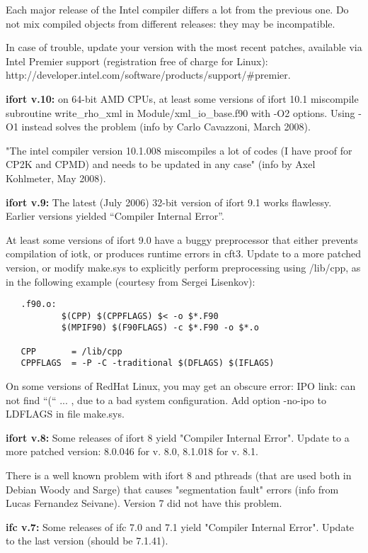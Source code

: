 \documentclass[12pt,a4paper]{article}
\begin{document}
Each major release of the Intel compiler differs a lot from the previous one.
Do not mix compiled objects from different releases: they may be incompatible.
    
In case of trouble, update your version with the most recent patches,
available via Intel Premier support (registration free of charge for Linux):
http://developer.intel.com/software/products/support/\#premier.

{\bf ifort v.10:} on 64-bit AMD CPUs, at least some versions of ifort 10.1 
miscompile subroutine write\_rho\_xml in Module/xml\_io\_base.f90 with -O2
options. Using -O1 instead solves the problem (info by Carlo
Cavazzoni, March 2008). 

"The intel compiler version 10.1.008 miscompiles a lot of codes (I have proof 
for CP2K and CPMD) and needs to be updated in any case" (info by Axel
Kohlmeter, May 2008).
 
{\bf ifort v.9:} The latest (July 2006) 32-bit version of ifort 9.1
works flawlessy. Earlier versions yielded ``Compiler Internal Error''.

At least some versions of ifort 9.0 have a buggy preprocessor that either
prevents compilation of iotk, or produces runtime errors in cft3. Update
to a more patched version, or modify make.sys to explicitly perform 
preprocessing using /lib/cpp, as in the following example (courtesy from Sergei
Lisenkov):
\begin{verbatim}
   .f90.o:
           $(CPP) $(CPPFLAGS) $< -o $*.F90
           $(MPIF90) $(F90FLAGS) -c $*.F90 -o $*.o

   CPP       = /lib/cpp
   CPPFLAGS  = -P -C -traditional $(DFLAGS) $(IFLAGS)
\end{verbatim}
    
On some versions of RedHat Linux, you may get an obscure error: IPO
link: can not find ``(`` ... , due to a bad system configuration. Add
option -no-ipo to LDFLAGS in file make.sys.

{\bf ifort v.8:} Some releases of ifort 8 yield "Compiler Internal
Error". Update to a more patched version: 8.0.046 for v. 8.0, 8.1.018
for v. 8.1. 

There is a well known problem with ifort 8 and pthreads (that are used
both in Debian Woody and Sarge) that causes "segmentation fault" errors
(info from Lucas Fernandez Seivane). Version 7 did not have this problem.

{\bf ifc v.7:} Some releases of ifc 7.0 and 7.1 yield "Compiler
Internal Error". Update to the last version (should be 7.1.41).
\end{document}
